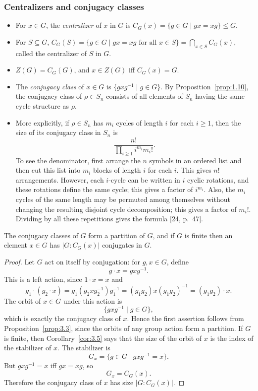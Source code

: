 \documentclass[../Odyssey_Project.tex]{subfiles}
\begin{document}
\subsubsection*{Centralizers and conjugacy classes}
\begin{itemize}
    \item For $x \in G$, the \emph{centralizer} of $x$ in $G$ is $C_G(x) = \{g \in G \mid gx = xg\} \leq G$.
    \item For $S \subseteq G$, $C_G(S) = \{g \in G \mid gx = xg \text{ for all } x \in S\} = \bigcap_{x \in S} C_G(x)$, called the centralizer of $S$ in $G$.
    \item $Z(G) = C_G(G)$, and $x \in Z(G)$ iff $C_G(x) = G$.
    \item The \emph{conjugacy class} of $x \in G$ is $\{gxg^{-1} \mid g \in G\}$. By Proposition~\ref{prop:1.10}, the conjugacy class of $\rho \in S_n$ consists of all elements of $S_n$ having the same cycle structure as $\rho$.
    \item More explicitly, if $\rho \in S_n$ has $m_i$ cycles of length $i$ for each $i \geq 1$, then the size of its conjugacy class in $S_n$ is
          \[
              \frac{n!}{\prod_{i \geq 1} i^{m_i}m_i!}.
          \]
          To see the denominator, first arrange the $n$ symbols in an ordered list and then cut this list into $m_i$ blocks of length $i$ for each $i$. This gives $n!$ arrangements. However, each $i$-cycle can be written in $i$ cyclic rotations, and these rotations define the same cycle; this gives a factor of $i^{m_i}$. Also, the $m_i$ cycles of the same length may be permuted among themselves without changing the resulting disjoint cycle decomposition; this gives a factor of $m_i!$. Dividing by all these repetitions gives the formula [24, p.~47].
\end{itemize}

\begin{proposition}
\label{prop:3.13}
The conjugacy classes of $G$ form a partition of $G$, and if $G$ is finite then an element $x \in G$ has $|G : C_G(x)|$ conjugates in $G$.
\end{proposition}

\begin{proof}
    Let $G$ act on itself by conjugation: for $g,x \in G$, define
    \[
        g \cdot x = gxg^{-1}.
    \]
    This is a left action, since $1 \cdot x = x$ and
    \[
        g_1 \cdot (g_2 \cdot x)
        = g_1(g_2xg_2^{-1})g_1^{-1}
        = (g_1g_2)x(g_1g_2)^{-1}
        = (g_1g_2)\cdot x.
    \]
    The orbit of $x \in G$ under this action is
    \[
        \{gxg^{-1} \mid g \in G\},
    \]
    which is exactly the conjugacy class of $x$. Hence the first assertion follows from Proposition~\ref{prop:3.3}, since the orbits of any group action form a partition.
    If $G$ is finite, then Corollary~\ref{cor:3.5} says that the size of the orbit of $x$ is the index of the stabilizer of $x$. The stabilizer is
    \[
        G_x = \{g \in G \mid gxg^{-1} = x\}.
    \]
    But $gxg^{-1}=x$ iff $gx=xg$, so
    \[
        G_x = C_G(x).
    \]
    Therefore the conjugacy class of $x$ has size $|G : C_G(x)|$.
\end{proof}
\end{document}
